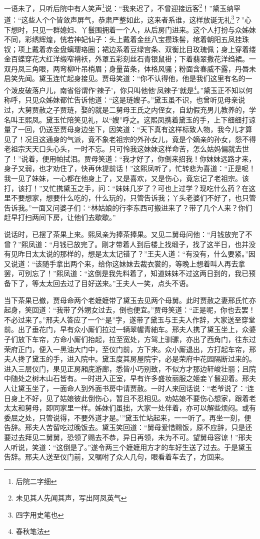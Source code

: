 \documentclass[12pt,oneside]{book}
\begin{document}
一语未了，只听后院中有人笑声\footnote{后院二字细}说：“我来迟了，不曾迎接远客\footnote{未见其人先闻其声，写出阿凤英气}！”黛玉纳罕道：“这些人个个皆敛声屏气，恭肃严整如此，这来者系谁，这样放诞无礼\footnote{四字用史笔也}？”心下想时，只见一群媳妇、丫鬟围拥着一个人，从后房门进来。这个人打扮与众姊妹不同，彩绣辉煌，恍若神妃仙子：头上戴着金丝八宝攒珠髻，绾着朝阳五凤挂珠钗；项上戴着赤金盘螭璎珞圈；裙边系着豆绿宫条、双衡比目玫瑰佩；身上穿着缕金百蝶穿花大红洋缎窄褙袄，外罩五彩刻丝石青银鼠褂；下着翡翠撒花洋绉裙。一双丹凤三角眼，两弯柳叶吊梢眉；身量苗条，体格风骚；粉面含春威不露，丹唇未启笑先闻。黛玉连忙起身接见。贾母笑道：“你不认得他，他是我们这里有名的一个泼皮破落户儿，南省俗谓作‘辣子’，你只叫他他‘凤辣子’就是\footnote{春秋笔法}。”黛玉正不知以何称呼，只见众姊妹都忙告诉他道：“这是琏嫂子。”黛玉虽不识，也曾听见母亲说过，大舅贾赦之子贾琏，娶的就是二舅母王氏之内侄女，自幼假充男儿教养的，学名叫王熙凤。黛玉忙陪笑见礼，以“嫂”呼之。这熙凤携着黛玉的手，上下细细打谅量了一回，仍送至贾母身边坐下，因笑道：“天下真有这样标致人物，我今儿才算见了！况且这通身的气派，竟不象老祖宗的外孙女儿，竟是个嫡亲的孙女，怨不得老祖宗天天口头心头，一时不忘。只可怜我这妹妹这样命苦，怎么姑妈偏就去世了！”说着，便用帕拭泪。贾母笑道：“我才好了，你倒来招我！你妹妹远路才来，身子又弱，也才劝住了，快再休提前话！”这熙凤听了，忙转悲为喜道：“正是呢！我一见了妹妹，一心都在他身上了，又是喜欢，又是伤心，竟忘记了老祖宗。该打，该打！”又忙携黛玉之手，问：“妹妹几岁了？可也上过学？现吃什么药？在这里不要想家，想要什么吃的，什么玩的，只管告诉我；丫头老婆们不好了，也只管告诉我。”一面又问婆子们：“林姑娘的行李东西可搬进来了？带了几个人来？你们赶早打扫两间下房，让他们去歇歇。”

说话时，已摆了茶果上来。熙凤亲为捧茶捧果。又见二舅母问他：“月钱放完了不曾？”熙凤道：“月钱已放完了。刚才带着人到后楼上找缎子，找了这半日，也并没有见昨日太太说的那样的，想是太太记错了？”王夫人道：“有没有，什么要紧。”因又说道：“该随手拿出两个来，给你这妹妹去裁衣裳的，等晚上想着叫人再去拿罢，可别忘了！”熙凤道：“这倒是我先料着了，知道妹妹不过这两日到的，我已预备下了，等太太回去过了目好送来。”王夫人一笑，点头不语。

当下茶果已撤，贾母命两个老嬷嬷带了黛玉去见两个母舅。此时贾赦之妻邢氏忙亦起身，笑回道：“我带了外甥女过去，倒也便宜。”贾母笑道：“正是呢，你也去罢！不必过来了。”邢夫人答应了一个“是”字，遂带了黛玉与王夫人作辞，大家送至穿堂前。出了垂花门，早有众小厮们拉过一辆翠幄青紬车。邢夫人携了黛玉坐上，众婆子们放下车帘，方命小厮们抬起，拉至宽处，方驾上驯骡，亦出了西角门，往东过荣府正门，便入一黑油大门中，至仪门前，方下来。众小厮退出，方打起车帘，邢夫人搀了黛玉的手，进入院中。黛玉度其房屋院宇，必是荣府中花园隔断过来的。进入三层仪门，果见正房厢庑游廊，悉皆小巧别致，不似方才那边轩峻壮丽；且院中随处之树木山石皆有。一时进入正室，早有许多盛妆丽服之姬妾丫鬟迎着。邢夫人让黛玉坐了，一面命人到外面书房中请贾赦。一时人来回话说：“老爷说了：‘连日身上不好，见了姑娘彼此倒伤心，暂且不忍相见。劝姑娘不要伤心想家，跟着老太太和舅母，即同家里一样。姊妹们虽拙，大家一处伴着，亦可以解些烦闷。或有委屈之处，只管说得，不要外道才是。’”黛玉忙站起来，一一听了。再坐一刻，便告辞。邢夫人苦留吃过晚饭去。黛玉笑回道：“舅母爱惜赐饭，原不应辞，只是还要过去拜见二舅舅，恐领了赐去不恭，异日再领，未为不可。望舅母容谅！”邢夫人听说，笑道：“这倒是了。”遂令两三个嬷嬷用方才的车好生送了过去。于是黛玉告辞。邢夫人送至仪门前，又嘱咐了众人几句，眼看着车去了，方回来。
\end{document}
